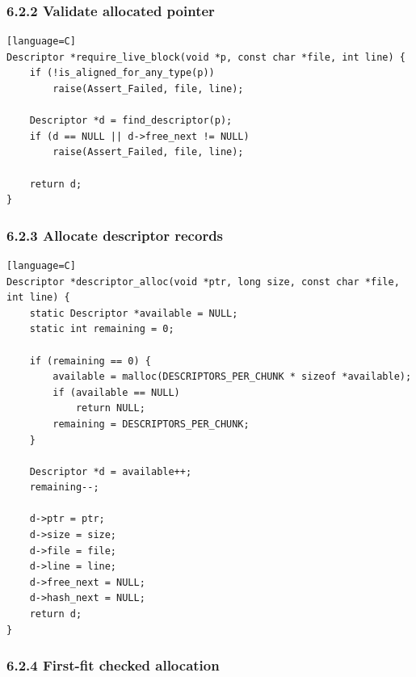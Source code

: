 \documentclass[11pt]{article}
\begin{document}
\subsubsection{6.2.2 Validate allocated pointer}\label{validate-allocated-pointer}

\begin{verbatim}[language=C]
Descriptor *require_live_block(void *p, const char *file, int line) {
    if (!is_aligned_for_any_type(p))
        raise(Assert_Failed, file, line);

    Descriptor *d = find_descriptor(p);
    if (d == NULL || d->free_next != NULL)
        raise(Assert_Failed, file, line);

    return d;
}
\end{verbatim}

\subsubsection{6.2.3 Allocate descriptor records}\label{allocate-descriptor-records}

\begin{verbatim}[language=C]
Descriptor *descriptor_alloc(void *ptr, long size, const char *file, int line) {
    static Descriptor *available = NULL;
    static int remaining = 0;

    if (remaining == 0) {
        available = malloc(DESCRIPTORS_PER_CHUNK * sizeof *available);
        if (available == NULL)
            return NULL;
        remaining = DESCRIPTORS_PER_CHUNK;
    }

    Descriptor *d = available++;
    remaining--;

    d->ptr = ptr;
    d->size = size;
    d->file = file;
    d->line = line;
    d->free_next = NULL;
    d->hash_next = NULL;
    return d;
}
\end{verbatim}

\subsubsection{6.2.4 First-fit checked allocation}\label{first-fit-checked-allocation}
\end{document}
